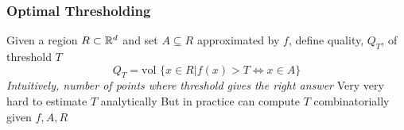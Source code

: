 \documentclass{beamer}
\begin{document}
\begin{frame}
\frametitle{Optimal Thresholding}
Given a region $R \subset \mathbb{R}^d$ and set $A \subseteq R$ approximated by $f$, define quality, $Q_T$, of threshold $T$
\[ Q_T = \text{vol } \{ x \in R | f(x) > T \Leftrightarrow x \in A \} \]
\emph{Intuitively, number of points where threshold gives the right answer}
\vskip5pt
Very very hard to estimate $T$ analytically
\pause
\vskip5pt
But in practice can compute $T$ combinatorially given $f, A, R$
\end{frame}
\end{document}
